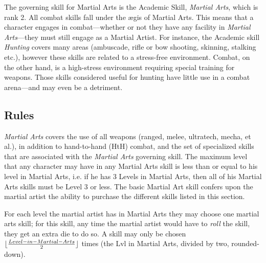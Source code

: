 The governing skill for Martial Arts is the Academic Skill,
\emph{Martial Arts}, which is rank 2.  All combat skills fall under
the \ae{}gis of Martial Arts. This means that a character engages in
combat---whether or not they have any facility in \emph{Martial
  Arts}---they must still engage as a Martial Artist. For instance,
the Academic skill \emph{Hunting} covers many areas (ambuscade, rifle
or bow shooting, skinning, stalking etc.), however these skills are
related to a stress-free environment. Combat, on the other hand, is a
high-stress environment requiring special training for weapons. Those
skills considered useful for hunting have little use in a combat
arena---and may even be a detriment.


\subsection{Rules}

\emph{Martial Arts} covers the use of all weapons (ranged, melee,
ultratech, mecha, et al.), in addition to hand-to-hand (HtH) combat,
and the set of specialized skills that are associated with the
\emph{Martial Arts} governing skill.  The maximum level that any
character may have in any Martial Arts skill is less than or equal to
his level in Martial Arts, i.e. if he has 3 Levels in Martial Arts,
then all of his Martial Arts skills must be Level 3 or less.  The
basic Martial Art skill confers upon the martial artist the ability to
purchase the different skills listed in this section.

For each level the martial artist has in Martial Arts they may choose
one martial arts skill; for this skill, any time the martial artist
would have to \emph{roll} the skill, they get an extra die to do so. A
skill may only be chosen
$\lfloor{{Level-in-Martial-Arts}\over{2}}\rfloor$ times (the Lvl in
Martial Arts, divided by two, rounded-down).


